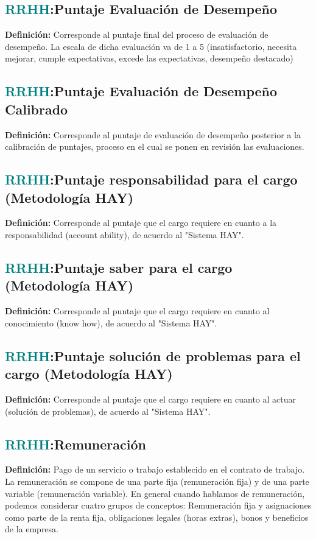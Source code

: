 \documentclass[12pt]{article}
\begin{document}
\subsection{\textcolor{teal}{RRHH}:{Puntaje Evaluación de Desempeño}}
\textbf{Definición:} Corresponde al puntaje final del proceso de evaluación de desempeño. La escala de dicha evaluación va de 1 a 5 (insatisfactorio, necesita mejorar, cumple expectativas, excede las expectativas, desempeño destacado)
\subsection{\textcolor{teal}{RRHH}:{Puntaje Evaluación de Desempeño Calibrado}}
\textbf{Definición:} Corresponde al puntaje de evaluación de desempeño posterior a la calibración de puntajes, proceso en el cual se ponen en revisión las evaluaciones.
\subsection{\textcolor{teal}{RRHH}:{Puntaje responsabilidad para el cargo (Metodología HAY)}}
\textbf{Definición:} Corresponde al puntaje que el cargo requiere en cuanto a la responsabilidad (account ability), de acuerdo al "Sistema HAY".
\subsection{\textcolor{teal}{RRHH}:{Puntaje saber para el cargo (Metodología HAY)}}
\textbf{Definición:} Corresponde al puntaje que el cargo requiere en cuanto al conocimiento (know how), de acuerdo al "Sistema HAY".
\subsection{\textcolor{teal}{RRHH}:{Puntaje solución de problemas para el cargo (Metodología HAY)}}
\textbf{Definición:} Corresponde al puntaje que el cargo requiere en cuanto al actuar (solución de problemas), de acuerdo al "Sistema HAY".
\subsection{\textcolor{teal}{RRHH}:{Remuneración}}
\textbf{Definición:} Pago de un servicio o trabajo establecido en el contrato de trabajo. La remuneración se compone de una parte fija (remuneración fija) y de una parte variable (remuneración variable). En general cuando hablamos de remuneración, podemos considerar cuatro grupos de conceptos:
Remuneración fija y asignaciones como parte de la renta fija, obligaciones legales (horas extras), bonos y beneficios de la empresa.
\end{document}
